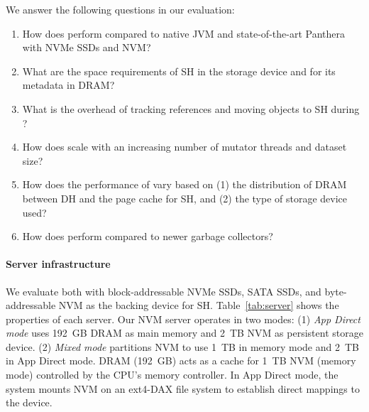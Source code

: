 We answer the following questions in our evaluation:
\begin{enumerate}
  \item How does \teraheapName{} perform compared to native JVM and
    state-of-the-art Panthera with NVMe SSDs and NVM?
  \item What are the space requirements of SH in the storage device
    and for its metadata in DRAM?
  \item What is the overhead of tracking references and moving
    objects to SH during \teraheapGC?
  \item How does \teraheapName{} scale with an increasing number of mutator
    threads and dataset size?
  \item How does the performance of \teraheapName{} vary based on (1) the
    distribution of DRAM between DH and the page cache for SH, and (2) the
    type of storage device used?
  \item How does \teraheapName{} perform compared to newer garbage
    collectors?
\end{enumerate}

\paragraph{\textbf{Server infrastructure}}
We evaluate \teraheapName{} both with block-addressable NVMe SSDs,
SATA SSDs, and byte-addressable NVM as the backing device
for SH. Table~\ref{tab:server} shows the properties of each server.
Our NVM server operates in two modes:
%
(1) \emph{App Direct mode} uses \SI{192}{GB} DRAM as main memory and
\SI{2}{TB} NVM as persistent storage device.
%
(2) \emph{Mixed mode} partitions NVM to use \SI{1}{TB} in memory mode
and \SI{2}{TB} in App Direct mode. DRAM (\SI{192}{GB}) acts as a cache
for \SI{1}{TB} NVM (memory mode) controlled by the CPU's memory
controller. In App Direct mode, the system mounts NVM on an ext4-DAX
file system to establish direct mappings to the device.

